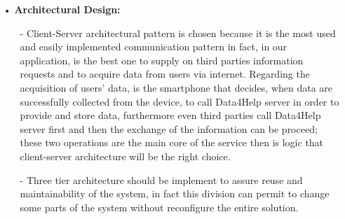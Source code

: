 \begin{enumerate}
\item[•] \textbf{Architectural Design: }\\

	\begin{enumerate}
	\item[-] Client-Server architectural pattern is chosen because it is the most used and easily implemented communication pattern in fact, in our application, is the best one to supply on third parties information requests and to acquire data from users via internet. 
Regarding the acquisition of users’ data, is the smartphone that decides, when data are successfully collected from the device, to call Data4Help server in order to provide and store data, furthermore even third parties call Data4Help server first and then the exchange of the information can be proceed; these two operations are the main core of the service then is logic that client-server architecture will be the right choice. 

	\item[-]Three tier architecture should be implement to assure reuse and maintainability of the system, in fact this division can permit to change some parts of the system without reconfigure the entire solution.
	

\end{enumerate}
\end{enumerate}
